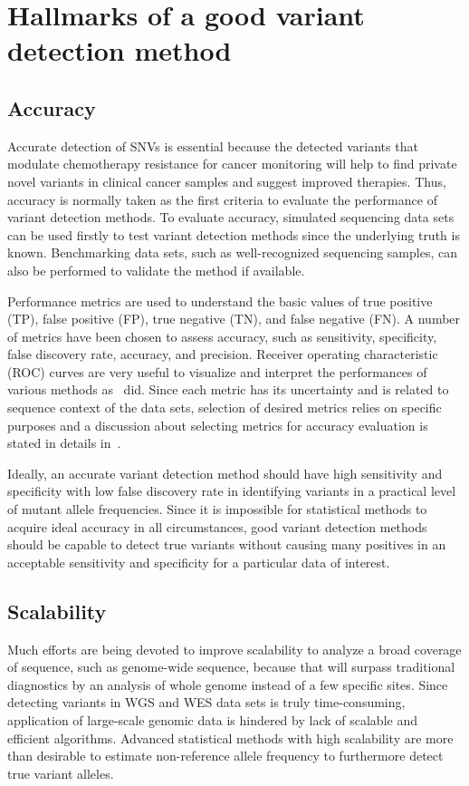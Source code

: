 \documentclass[a4,center,fleqn]{NAR}
\begin{document}
\section{Hallmarks of a good variant detection method}

\subsection{Accuracy}
Accurate detection of SNVs is essential because the detected variants that modulate chemotherapy resistance for cancer monitoring will help to find private novel variants in clinical cancer samples and suggest improved therapies.
Thus, accuracy is normally taken as the first criteria to evaluate the performance of variant detection methods.
To evaluate accuracy, simulated sequencing data sets can be used firstly to test variant detection methods since the underlying truth is known.
Benchmarking data sets, such as well-recognized sequencing samples, can also be performed to validate the method if available.

Performance metrics are used to understand the basic values of true positive (TP), false positive (FP), true negative (TN), and false negative (FN).
A number of metrics have been chosen to assess accuracy, such as sensitivity, specificity, false discovery rate, accuracy, and precision.
Receiver operating characteristic (ROC) curves are very useful to visualize and interpret the performances of various methods as~\citep{Xu2014, Huang2015, He2015} did.
Since each metric has its uncertainty and is related to sequence context of the data sets, selection of desired metrics relies on specific purposes and a discussion about selecting metrics for accuracy evaluation is stated in details in~\citep{Olson2015}.

Ideally, an accurate variant detection method should have high sensitivity and specificity with low false discovery rate in identifying variants in a practical level of mutant allele frequencies.
Since it is impossible for statistical methods to acquire ideal accuracy in all circumstances, good variant detection methods should be capable to detect true variants without causing many positives in an acceptable sensitivity and specificity for a particular data of interest.


\subsection{Scalability}

Much efforts are being devoted to improve scalability to analyze a broad coverage of sequence, such as genome-wide sequence, because that will surpass traditional diagnostics by an analysis of whole genome instead of a few specific sites.
Since detecting variants in WGS and WES data sets is truly time-consuming, application of large-scale genomic data is hindered by lack of scalable and efficient algorithms.
Advanced statistical methods with high scalability are more than desirable to estimate non-reference allele frequency to furthermore detect true variant alleles.
\end{document}
